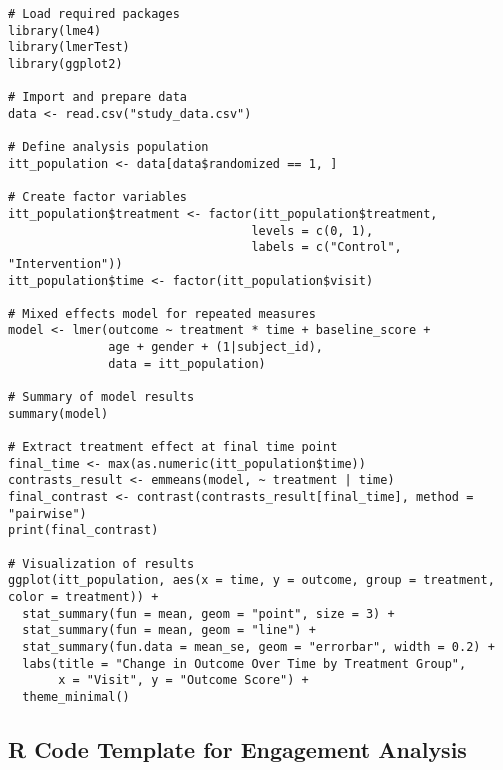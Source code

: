 \begin{tcolorbox}[title=R Code for Mixed Effects Model]
\begin{verbatim}
# Load required packages
library(lme4)
library(lmerTest)
library(ggplot2)

# Import and prepare data
data <- read.csv("study_data.csv")

# Define analysis population
itt_population <- data[data$randomized == 1, ]

# Create factor variables
itt_population$treatment <- factor(itt_population$treatment, 
                                  levels = c(0, 1), 
                                  labels = c("Control", "Intervention"))
itt_population$time <- factor(itt_population$visit)

# Mixed effects model for repeated measures
model <- lmer(outcome ~ treatment * time + baseline_score + 
              age + gender + (1|subject_id), 
              data = itt_population)

# Summary of model results
summary(model)

# Extract treatment effect at final time point
final_time <- max(as.numeric(itt_population$time))
contrasts_result <- emmeans(model, ~ treatment | time)
final_contrast <- contrast(contrasts_result[final_time], method = "pairwise")
print(final_contrast)

# Visualization of results
ggplot(itt_population, aes(x = time, y = outcome, group = treatment, color = treatment)) +
  stat_summary(fun = mean, geom = "point", size = 3) +
  stat_summary(fun = mean, geom = "line") +
  stat_summary(fun.data = mean_se, geom = "errorbar", width = 0.2) +
  labs(title = "Change in Outcome Over Time by Treatment Group",
       x = "Visit", y = "Outcome Score") +
  theme_minimal()
\end{verbatim}
\end{tcolorbox}

\subsection{R Code Template for Engagement Analysis}

